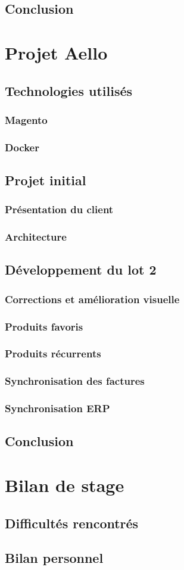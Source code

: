 \documentclass{Article}
\begin{document}
	\subsection{Conclusion}
\section{Projet Aello}
	\subsection{Technologies utilisés}
		\subsubsection{Magento}
		\subsubsection{Docker}
	\subsection{Projet initial}
		\subsubsection{Présentation du client}
		\subsubsection{Architecture}
	\subsection{Développement du lot 2}
		\subsubsection{Corrections et amélioration visuelle}
		\subsubsection{Produits favoris}
		\subsubsection{Produits récurrents}
		\subsubsection{Synchronisation des factures}
		\subsubsection{Synchronisation ERP}
	\subsection{Conclusion}	
\section{Bilan de stage}
	\subsection{Difficultés rencontrés}
	\subsection{Bilan personnel}
\end{document}

